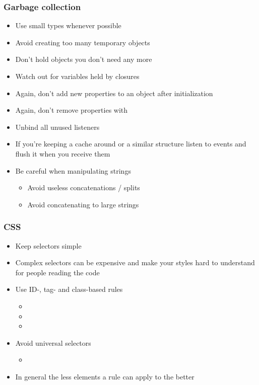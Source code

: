 \begin{frame}
 \frametitle{Garbage collection}
 \begin{itemize}
  \item Use small types whenever possible
  \item Avoid creating too many temporary objects
  \item Don't hold objects you don't need any more
  \item Watch out for variables held by closures
  \item Again, don't add new properties to an object after initialization
  \item Again, don't remove properties with 
  \item Unbind all unused listeners
  \item If you're keeping a cache around or a similar structure listen to
         events and flush it when you receive them
  \item Be careful when manipulating strings
  \begin{itemize}
   \item Avoid useless concatenations / splits
   \item Avoid concatenating to large strings
  \end{itemize}
 \end{itemize}
\end{frame}

\begin{frame}
 \frametitle{CSS}
 \begin{itemize}
  \item Keep selectors simple
  \item Complex selectors can be expensive and make your styles hard to
        understand for people reading the code
  \item Use ID-, tag- and class-based rules
  \begin{itemize}
   \item {}
   \item {}
   \item {}
  \end{itemize}
  \item Avoid universal selectors
  \begin{itemize}
   \item \sourcecode{[hidden=true] \{\ldots{}\}}
  \end{itemize}
  \item In general the less elements a rule can apply to the better
 \end{itemize}
\end{frame}

